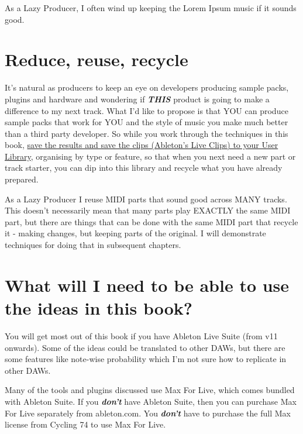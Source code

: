 \documentclass[
  12pt,
  letterpaper,
  oneside,
  open=any]{scrbook}
\begin{document}
As a Lazy Producer, I often wind up keeping the Lorem Ipsum music if it
sounds good.

\section*{Reduce, reuse, recycle}\label{reduce-reuse-recycle}


It's natural as producers to keep an eye on developers producing sample
packs, plugins and hardware and wondering if \textbf{\emph{THIS}}
product is going to make a difference to my next track. What I'd like to
propose is that YOU can produce sample packs that work for YOU and the
style of music you make much better than a third party developer. So
while you work through the techniques in this book,
\href{https://www.ableton.com/en/live-manual/12/managing-files-and-sets/\#live-clips}{save
the results and save the clips (Ableton's Live Clips) to your User
Library}, organising by type or feature, so that when you next need a
new part or track starter, you can dip into this library and recycle
what you have already prepared.

As a Lazy Producer I reuse MIDI parts that sound good across MANY
tracks. This doesn't necessarily mean that many parts play EXACTLY the
same MIDI part, but there are things that can be done with the same MIDI
part that recycle it - making changes, but keeping parts of the
original. I will demonstrate techniques for doing that in subsequent
chapters.

\section*{What will I need to be able to use the ideas in this
book?}\label{what-will-i-need-to-be-able-to-use-the-ideas-in-this-book}


You will get most out of this book if you have Ableton Live Suite (from
v11 onwards). Some of the ideas could be translated to other DAWs, but
there are some features like note-wise probability which I'm not sure
how to replicate in other DAWs.

Many of the tools and plugins discussed use Max For Live, which comes
bundled with Ableton Suite. If you \textbf{\emph{don't}} have Ableton
Suite, then you can purchase Max For Live separately from ableton.com.
You \textbf{\emph{don't}} have to purchase the full Max license from
Cycling 74 to use Max For Live.
\end{document}
